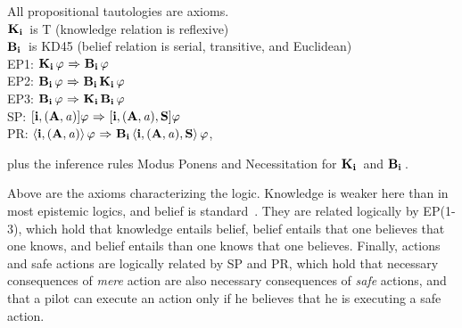 \begin{tcolorbox}All propositional tautologies are axioms.\\$\mathbf{K}_{\mathbf{i}}\,$ is T (knowledge relation is reflexive)\\
	$\mathbf{B}_{\mathbf{i}}\,$ is KD45 (belief relation is serial, transitive, and Euclidean)\\
	EP1: $\mathbf{K}_{\mathbf{i}}\,\varphi {\ \Rightarrow \ } \mathbf{B}_{\mathbf{i}}\,\varphi$ \\
	EP2: $\mathbf{B}_{\mathbf{i}}\,\varphi {\ \Rightarrow \ } \mathbf{B}_{\mathbf{i}}\,\mathbf{K}_{\mathbf{i}}\,\varphi$\\
	EP3: $\mathbf{B}_{\mathbf{i}}\,\varphi {\ \Rightarrow \ } \mathbf{K}_{\mathbf{i}}\,\mathbf{B}_{\mathbf{i}}\,\varphi$\\
	SP: $\mathbf{[{i,(A,\mathit{a})}]}\varphi {\ \Rightarrow \ } \mathbf{[{i,(A,\mathit{a}),S}]}\varphi$\\
	PR: $\mathbf{\langle i, (A,\mathit{a}) \rangle}\,\varphi {\ \Rightarrow \ } \mathbf{B}_{\mathbf{i}}\,\mathbf{\langle i, (A,\mathit{a}),\mathbf{S} \rangle}\,\varphi$,\\
\end{tcolorbox}
\noindent plus the inference rules Modus Ponens and Necessitation for $\mathbf{K}_{\mathbf{i}}\,$ and $\mathbf{B}_{\mathbf{i}}\,$.

Above are the axioms characterizing the logic. Knowledge is weaker here than in most epistemic logics, and belief is standard~\cite{FHMV}. They are related logically by EP(1-3), which hold that knowledge entails belief, belief entails that one believes that one knows, and belief entails than one knows that one believes. Finally, actions and safe actions are logically related by SP and PR, which hold that necessary consequences of \emph{mere} action are also necessary consequences of \emph{safe} actions, and that a pilot can execute an action only if he believes that he is executing a safe action. 

